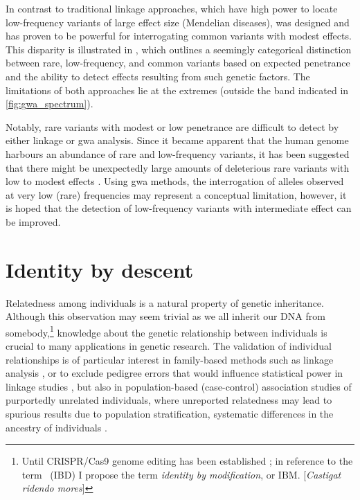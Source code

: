 %

%

In contrast to traditional linkage approaches, which have high power to locate low-frequency variants of large effect size (\eg Mendelian diseases),  was designed and has proven to be powerful for interrogating common variants with modest effects.
This disparity is illustrated in , which outlines a seemingly categorical distinction between rare, low-frequency, and common variants based on expected penetrance and the ability to detect effects resulting from such genetic factors.
The limitations of both approaches lie at the extremes (outside the band indicated in \cref{fig:gwa_spectrum}).

Notably, rare variants with modest or low penetrance are difficult to detect by either linkage or \gls{gwa} analysis.
Since it became apparent that the human genome harbours an abundance of rare and low-frequency variants, it has been suggested that there might be unexpectedly large amounts of deleterious rare variants with low to modest effects \citep{Coventry:2010cqa,Keinan:2012kl,Tennessen:2012ck}.
Using \gls{gwa} methods, the interrogation of alleles observed at very low (rare) frequencies may represent a conceptual limitation, however, it is hoped that the detection of low-frequency variants with intermediate effect can be improved.


%
\section{Identity by descent}
\label{sec:ibd_definition}
%

Relatedness among individuals is a natural property of genetic inheritance.
Although this observation may seem trivial as we all inherit our DNA from somebody,\footnote{Until CRISPR/Cas9 genome editing has been established \citep[\eg see][]{Cai:2016km}; in reference to the term \emph{}~(IBD) I propose the term \emph{identity by modification}, or IBM. {\color{oxgray}[\textit{Castigat ridendo mores}]}} knowledge about the genetic relationship between individuals is crucial to many applications in genetic research.
The validation of individual relationships is of particular interest in family-based methods such as linkage analysis \citep{Purcell:2007dg,Albrechtsen:2009cb}, or to exclude pedigree errors that would influence statistical power in linkage studies \citep{Boehnke:1997ku}, but also in population-based (case-control) association studies of purportedly unrelated individuals, where unreported relatedness may lead to spurious results due to population stratification, \ie systematic differences in the ancestry of individuals \citep{Freedman:2004dk,Voight:2005cr}.

